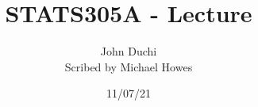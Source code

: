 




\title{STATS305A - Lecture }
\author{John Duchi\\ Scribed by Michael Howes}
\date{11/07/21}

\pagestyle{fancy}
\fancyhf{}


\maketitle
\tableofcontents
